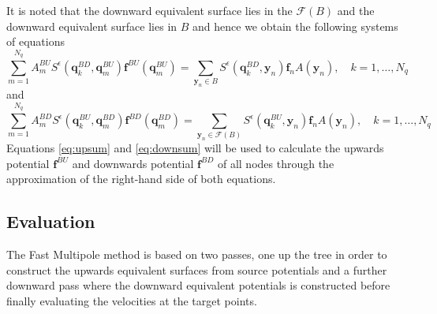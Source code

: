 It is noted that the downward equivalent surface lies in the $\mathcal{F}(B)$ and the downward equivalent surface lies in $B$ and hence we obtain the following systems of equations
\begin{equation}
\label{eq:upsum}
    \sum_{m=1}^{N_{q}} A_{m}^{BU} S^\epsilon\left(\bm{q}^{BD}_{k}, \bm{q}_{m}^{B U}\right) \bm{f}^{B U}\left(\bm{q}_{m}^{B U}\right)=\sum_{{\bm{y}}_{n} \in B} S^\epsilon\left(\bm{q}^{BD}_{k}, {\bm{y}}_{n}\right) {\bm{f}}_{n} A({\bm{y}}_n), \quad k=1,\dots,N_q
\end{equation}
and
\begin{equation}
\label{eq:downsum}
    \sum_{m=1}^{N_{q}} A_{m}^{BD} S^\epsilon\left(\bm{q}^{BU}_{k}, \bm{q}_{m}^{B D}\right) \bm{f}^{B D}\left(\bm{q}_{m}^{B D}\right)=\sum_{{\bm{y}}_{n} \in \mathcal{F}(B)} S^\epsilon\left(\bm{q}^{BU}_{k}, {\bm{y}}_{n}\right) {\bm{f}}_{n} A({\bm{y}}_n), \quad k=1,\dots,N_q
\end{equation}
Equations \ref{eq:upsum} and \ref{eq:downsum} will be used to calculate the upwards potential $\bm{f}^{B U}$ and downwards potential $\bm{f}^{B D}$ of all nodes through the approximation of the right-hand side of both equations.

\subsection{Evaluation}
The Fast Multipole method is based on two passes, one up the tree in order to construct the upwards equivalent surfaces from source potentials and a further downward pass where the downward equivalent potentials is constructed before finally evaluating the velocities at the target points.

